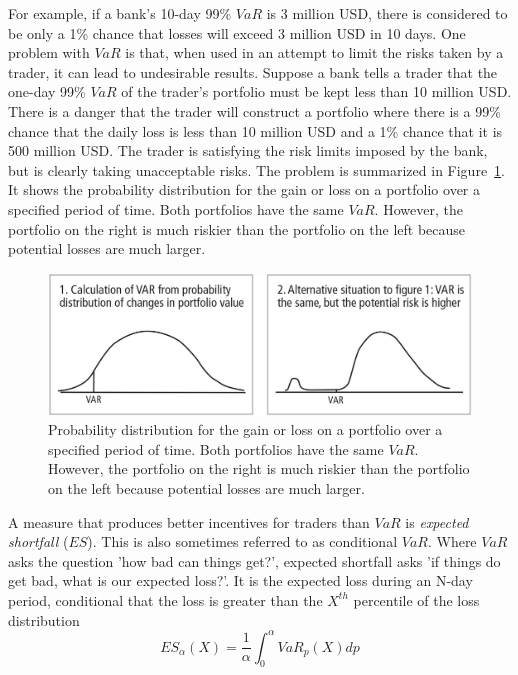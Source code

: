 For example, if a bank's 10-day 99\% $VaR$ is 3 million USD, there is considered to be only a 1\% chance that losses will exceed 3 million USD in 10 days. One problem with $VaR$ is that, when used in an attempt to limit the risks taken by a trader, it can lead to undesirable results. Suppose a bank tells a trader that the one-day 99\% $VaR$ of the trader's portfolio must be kept less than 10 million USD. There is a danger that the trader will construct a portfolio where there is a 99\% chance that the daily loss is less than 10 million USD and a 1\% chance that it is 500 million USD. The trader is satisfying the risk limits imposed by the bank, but is clearly taking unacceptable risks. 
The problem is summarized in Figure~\ref{fig:var_vs_badvar}. It shows the probability distribution for the gain or loss on a portfolio over a specified period of time. Both portfolios have the same $VaR$. However, the portfolio on the right is much riskier than the portfolio on the left because potential losses are much larger. 

\begin{figure}[htb]
\centering
\includegraphics[width=0.8\linewidth]{figures/var_badvar}
\caption{Probability distribution for the gain or loss on a portfolio over a specified period of time. Both portfolios have the same $VaR$. However, the portfolio on the right is much riskier than the portfolio on the left because potential losses are much larger.}
\label{fig:var_vs_badvar}
\end{figure}

A measure that produces better incentives for traders than $VaR$ is \emph{expected shortfall} ($ES$). This is also sometimes referred to as conditional $VaR$. Where $VaR$ asks the question 'how bad can things get?', expected shortfall asks 'if things do get bad, what is our expected loss?'. It is the expected loss during an N-day period, conditional that the loss is greater than the $X^{th}$ percentile of the loss distribution
\begin{equation}
ES_{\alpha}(X) = \frac{1}{\alpha}\int_0^\alpha VaR_p(X) dp
\label{eq:es}
\end{equation}

